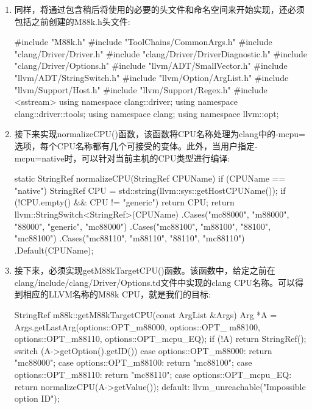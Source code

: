 \begin{enumerate}
\item
同样，将通过包含稍后将使用的必要的头文件和命名空间来开始实现，还必须包括之前创建的M88k.h头文件:

\begin{cpp}
#include "M88k.h"
#include "ToolChains/CommonArgs.h"
#include "clang/Driver/Driver.h"
#include "clang/Driver/DriverDiagnostic.h"
#include "clang/Driver/Options.h"
#include "llvm/ADT/SmallVector.h"
#include "llvm/ADT/StringSwitch.h"
#include "llvm/Option/ArgList.h"
#include "llvm/Support/Host.h"
#include "llvm/Support/Regex.h"
#include <sstream>
using namespace clang::driver;
using namespace clang::driver::tools;
using namespace clang;
using namespace llvm::opt;
\end{cpp}

\item
接下来实现normalizeCPU()函数，该函数将CPU名称处理为clang中的-mcpu=选项，每个CPU名称都有几个可接受的变体。此外，当用户指定-mcpu=native时，可以针对当前主机的CPU类型进行编译:

\begin{cpp}
static StringRef normalizeCPU(StringRef CPUName) {
    if (CPUName == "native") {
        StringRef CPU = std::string(llvm::sys::getHostCPUName());
        if (!CPU.empty() && CPU != "generic")
        return CPU;
    }
    return llvm::StringSwitch<StringRef>(CPUName)
    .Cases("mc88000", "m88000", "88000", "generic", "mc88000")
    .Cases("mc88100", "m88100", "88100", "mc88100")
    .Cases("mc88110", "m88110", "88110", "mc88110")
    .Default(CPUName);
}
\end{cpp}

\item
接下来，必须实现getM88kTargetCPU()函数。该函数中，给定之前在clang/include/clang/Driver/Options.td文件中实现的clang CPU名称。可以得到相应的LLVM名称的M88k CPU，就是我们的目标:

\begin{cpp}
StringRef m88k::getM88kTargetCPU(const ArgList &Args) {
    Arg *A = Args.getLastArg(options::OPT_m88000, options::OPT_
        m88100, options::OPT_m88110, options::OPT_mcpu_EQ);
    if (!A)
        return StringRef();
    switch (A->getOption().getID()) {
    case options::OPT_m88000:
        return "mc88000";
    case options::OPT_m88100:
        return "mc88100";
    case options::OPT_m88110:
        return "mc88110";
    case options::OPT_mcpu_EQ:
        return normalizeCPU(A->getValue());
    default:
        llvm_unreachable("Impossible option ID");
    }
}
\end{cpp}


\end{enumerate}
